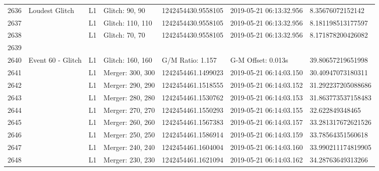 \begin{longtable}{lllllll}
2636 &                                     Loudest Glitch &       L1 &    Glitch: 90, 90 &  1242454430.9558105 &  2019-05-21 06:13:32.956 &    8.35676072152142 \\
2637 &                                                    &       L1 &  Glitch: 110, 110 &  1242454430.9558105 &  2019-05-21 06:13:32.956 &   8.181198513177597 \\
2638 &                                                    &       L1 &    Glitch: 70, 70 &  1242454430.9558105 &  2019-05-21 06:13:32.956 &   8.171878200426082 \\
2639 &                                                    &          &                   &                     &                          &                     \\
2640 &                                  Event 60 - Glitch &       L1 &  Glitch: 160, 160 &    G/M Ratio: 1.157 &       G-M Offset: 0.013s &   39.80657219651998 \\
2641 &                                                    &       L1 &  Merger: 300, 300 &  1242454461.1499023 &  2019-05-21 06:14:03.150 &   30.40947073180311 \\
2642 &                                                    &       L1 &  Merger: 290, 290 &  1242454461.1518555 &  2019-05-21 06:14:03.152 &  31.292237205088686 \\
2643 &                                                    &       L1 &  Merger: 280, 280 &  1242454461.1530762 &  2019-05-21 06:14:03.153 &  31.863773537158483 \\
2644 &                                                    &       L1 &  Merger: 270, 270 &  1242454461.1550293 &  2019-05-21 06:14:03.155 &     32.622849348465 \\
2645 &                                                    &       L1 &  Merger: 260, 260 &  1242454461.1567383 &  2019-05-21 06:14:03.157 &  33.281317672621526 \\
2646 &                                                    &       L1 &  Merger: 250, 250 &  1242454461.1586914 &  2019-05-21 06:14:03.159 &   33.78564351560618 \\
2647 &                                                    &       L1 &  Merger: 240, 240 &  1242454461.1604004 &  2019-05-21 06:14:03.160 &  33.990211174819905 \\
2648 &                                                    &       L1 &  Merger: 230, 230 &  1242454461.1621094 &  2019-05-21 06:14:03.162 &   34.28763649313266 \\

\end{longtable}
